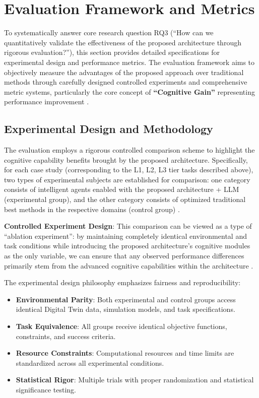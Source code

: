 \section{Evaluation Framework and Metrics}

To systematically answer core research question RQ3 (``How can we quantitatively validate the effectiveness of the proposed architecture through rigorous evaluation?''), this section provides detailed specifications for experimental design and performance metrics. The evaluation framework aims to objectively measure the advantages of the proposed approach over traditional methods through carefully designed controlled experiments and comprehensive metric systems, particularly the core concept of \textbf{``Cognitive Gain''} representing performance improvement \cite{stone2016artificial}.

\subsection{Experimental Design and Methodology}

The evaluation employs a rigorous controlled comparison scheme to highlight the cognitive capability benefits brought by the proposed architecture. Specifically, for each case study (corresponding to the L1, L2, L3 tier tasks described above), two types of experimental subjects are established for comparison: one category consists of intelligent agents enabled with the proposed architecture + LLM (experimental group), and the other category consists of optimized traditional best methods in the respective domains (control group) \cite{duan2022survey}.

\textbf{Controlled Experiment Design}: This comparison can be viewed as a type of ``ablation experiment'': by maintaining completely identical environmental and task conditions while introducing the proposed architecture's cognitive modules as the only variable, we can ensure that any observed performance differences primarily stem from the advanced cognitive capabilities within the architecture \cite{rogers2021primer}.

The experimental design philosophy emphasizes fairness and reproducibility:

\begin{itemize}
\item \textbf{Environmental Parity}: Both experimental and control groups access identical Digital Twin data, simulation models, and task specifications.
\item \textbf{Task Equivalence}: All groups receive identical objective functions, constraints, and success criteria.
\item \textbf{Resource Constraints}: Computational resources and time limits are standardized across all experimental conditions.
\item \textbf{Statistical Rigor}: Multiple trials with proper randomization and statistical significance testing.
\end{itemize}

